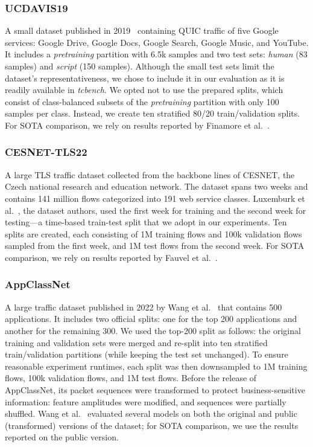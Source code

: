 \documentclass[lettersize,journal,twoside,article]{IEEEtran}
\begin{document}
\subsubsection*{UCDAVIS19}
A small dataset published in 2019~\cite{dataset_UCDAVIS19} containing QUIC traffic of five Google services: Google Drive, Google Docs, Google Search, Google Music, and  YouTube. It includes a \textit{pretraining} partition with 6.5k samples and two test sets: \textit{human} (83 samples) and \textit{script} (150 samples). Although the small test sets limit the dataset's representativeness, we chose to include it in our evaluation as it is readily available in \textit{tcbench}. We opted not to use the prepared splits, which consist of class-balanced subsets of the \textit{pretraining} partition with only 100 samples per class. Instead, we create ten stratified 80/20 train/validation splits. For SOTA comparison, we rely on results reported by Finamore et al.~\cite{finamore2023replication}.
 
\subsubsection*{CESNET-TLS22}
A large TLS traffic dataset collected from the backbone lines of CESNET, the Czech national research and education network. The dataset spans two weeks and contains 141 million flows categorized into 191 web service classes. Luxemburk et al.~\cite{Luxemburk2023TLS}, the dataset authors, used the first week for training and the second week for testing---a time-based train-test split that we adopt in our experiments. Ten splits are created, each consisting of 1M training flows and 100k validation flows sampled from the first week, and 1M test flows from the second week. For SOTA comparison, we rely on results reported by Fauvel et al.~\cite{fauvel2023lightweight}.

\subsubsection*{AppClassNet}
A large traffic dataset published in 2022 by Wang et al.~\cite{dataset_AppClassNet} that contains 500 applications. It includes two official splits: one for the top 200 applications and another for the remaining 300. We used the top-200 split as follows: the original training and validation sets were merged and re-split into ten stratified train/validation partitions (while keeping the test set unchanged). To ensure reasonable experiment runtimes, each split was then downsampled to 1M training flows, 100k validation flows, and 1M test flows. Before the release of AppClassNet, its packet sequences were transformed to protect business-sensitive information: feature amplitudes were modified, and sequences were partially shuffled. Wang et al.~\cite{dataset_AppClassNet} evaluated several models on both the original and public (transformed) versions of the dataset; for SOTA comparison, we use the results reported on the public version.
\end{document}
